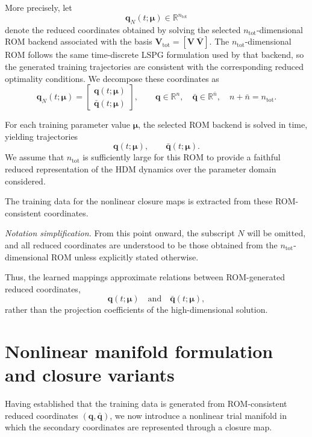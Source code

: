 \documentclass[11pt]{article}
\begin{document}
More precisely, let
\[
\mathbf q_N(t;\bm\mu) \in \mathbb R^{n_{\text{tot}}}
\]
denote the reduced coordinates obtained by solving the selected $n_{\text{tot}}$-dimensional ROM backend associated with the basis
$\mathbf V_{\text{tot}} = [\mathbf V \ \overline{\mathbf V}]$.
The $n_{\text{tot}}$-dimensional ROM follows the same time-discrete LSPG formulation used by that backend, so the generated training trajectories are consistent with the corresponding reduced optimality conditions.
We decompose these coordinates as
\begin{equation}
\mathbf q_N(t;\bm\mu)
=
\begin{bmatrix}
\mathbf q(t;\bm\mu) \\
\bar{\mathbf q}(t;\bm\mu)
\end{bmatrix},
\qquad
\mathbf q \in \mathbb R^{n},
\quad
\bar{\mathbf q} \in \mathbb R^{\bar n},
\quad
n+\bar n = n_{\text{tot}}.
\end{equation}

For each training parameter value $\bm\mu$, the selected ROM backend is solved in time, yielding trajectories
\[
\mathbf q(t;\bm\mu), 
\qquad 
\bar{\mathbf q}(t;\bm\mu).
\]
We assume that $n_{\text{tot}}$ is sufficiently large for this ROM to provide a faithful reduced representation of the HDM dynamics over the parameter domain considered.

The training data for the nonlinear closure maps is extracted from these ROM-consistent coordinates.

\medskip

\noindent
\emph{Notation simplification.}
From this point onward, the subscript $N$ will be omitted, and all reduced coordinates are understood to be those obtained from the $n_{\text{tot}}$-dimensional ROM unless explicitly stated otherwise.

\medskip

Thus, the learned mappings approximate relations between ROM-generated reduced coordinates,
\[
\mathbf q(t;\bm\mu)
\quad\text{and}\quad
\bar{\mathbf q}(t;\bm\mu),
\]
rather than the projection coefficients of the high-dimensional solution.
\section{Nonlinear manifold formulation and closure variants}

Having established that the training data is generated from ROM-consistent reduced coordinates $(\mathbf q,\bar{\mathbf q})$, we now introduce a nonlinear trial manifold in which the secondary coordinates are represented through a closure map.
\end{document}
